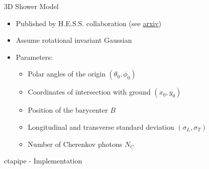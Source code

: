 \documentclass[aspectratio=1610, 9pt]{beamer}
\begin{document}
\begin{frame}{3D Shower Model}
    \begin{minipage}{0.49\textwidth}
        \begin{itemize}
            \item Published by H.E.S.S. collaboration (see \href{https://arxiv.org/abs/astro-ph/0601373v1}{arxiv})
            \item Assume rotational invariant Gaussian
            \item Parameters: \begin{itemize}
                    \item Polar angles of the origin $(\theta_0,\phi_0)$
                    \item Coordinates of intersection with ground $(x_0,y_0)$
                    \item Position of the barycenter $B$
                    \item Longitudinal and transverse standard deviation $(\sigma_L, \sigma_T)$
                    \item Number of Cherenkov photons $N_C$
                \end{itemize}
        \end{itemize}
    \end{minipage}
    \hfill
    \begin{minipage}{0.5\textwidth}
        \centering
    \end{minipage}
\end{frame}

\begin{frame}
  \begin{center}
      \fontsize{40}{48} \selectfont\textcolor{tugreen}{ctapipe - Implementation}
  \end{center}
\end{frame}
\end{document}
